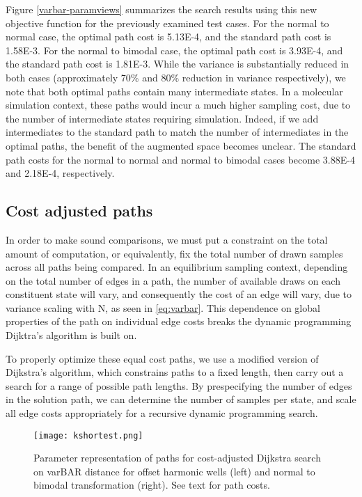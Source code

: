 Figure \ref{varbar-paramviews} summarizes the search results using this new objective function for the previously examined test cases. 
For the normal to normal case, the optimal path cost is 5.13E-4, and the standard path cost is 1.58E-3. For the normal to bimodal case, the optimal path cost is 3.93E-4, and the standard path cost is 1.81E-3.
While the variance is substantially reduced in both cases (approximately 70\% and 80\% reduction in variance respectively), we note that both optimal paths contain many intermediate states.
In a molecular simulation context, these paths would incur a much higher sampling cost, due to the number of intermediate states requiring simulation.
Indeed, if we add intermediates to the standard path to match the number of intermediates in the optimal paths, the benefit of the augmented space becomes unclear. 
The standard path costs for the normal to normal and normal to bimodal cases become 3.88E-4 and 2.18E-4, respectively.

\subsection{Cost adjusted paths}

In order to make sound comparisons, we must put a constraint on the total amount of computation, or equivalently, fix the total number of drawn samples across all paths being compared. 
In an equilibrium sampling context, depending on the total number of edges in a path, the number of available draws on each constituent state will vary, and consequently the cost of an edge will vary, due to variance scaling with N, as seen in \eqref{eq:varbar}. 
This dependence on global properties of the path on individual edge costs breaks the dynamic programming Dijktra's algorithm is built on.

To properly optimize these equal cost paths, we use a modified version of Dijkstra's algorithm, which constrains paths to a fixed length, then carry out a search for a range of possible path lengths. %
By prespecifying the number of edges in the solution path, we can determine the number of samples per state, and scale all edge costs appropriately for a recursive dynamic programming search.

\begin{figure}
    \centering
    \texttt{[image: kshortest.png]}
    \caption[Cost-adjusted Dijkstra search]{Parameter representation of paths for cost-adjusted Dijkstra search on varBAR distance for offset harmonic wells (left) and normal to bimodal transformation (right). See text for path costs.}
    \label{fig:kshortest}
\end{figure}

